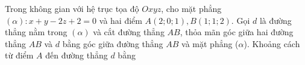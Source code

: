 \begin{bt}%
	Trong không gian với hệ trục tọa độ $Oxyz$, cho mặt phẳng $(\alpha): x+y-2z+2=0$ và hai điểm $A(2; 0; 1), B(1; 1; 2)$. Gọi $d$ là đường thẳng nằm trong $(\alpha)$  và cắt đường thẳng $AB$, thỏa mãn góc giữa hai đường thẳng $AB$ và $d$ bằng góc giữa đường thẳng $AB$ và mặt phẳng ($\alpha$). Khoảng cách từ điểm $A$ đến đường thẳng $d$ bằng
\end{bt}

